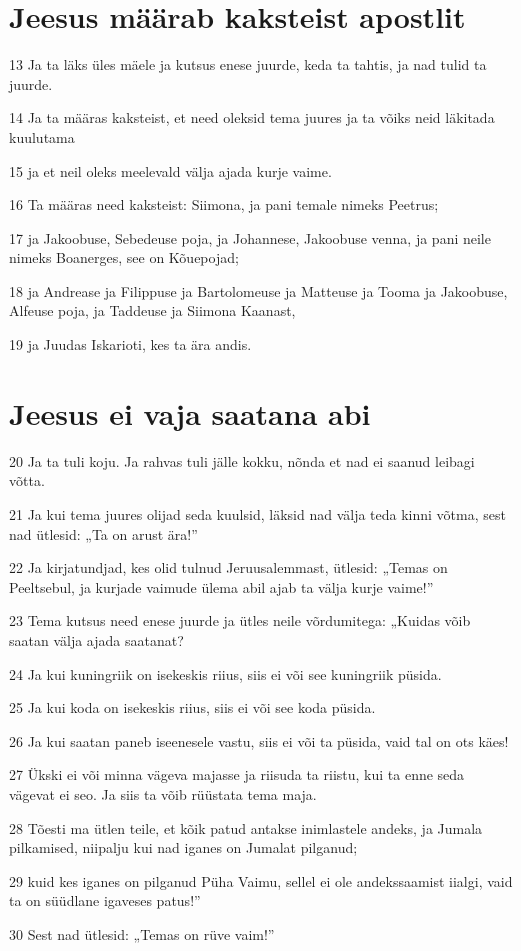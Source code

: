 \section*{Jeesus määrab kaksteist apostlit}

\par 13 Ja ta läks üles mäele ja kutsus enese juurde, keda ta tahtis, ja nad tulid ta juurde.
\par 14 Ja ta määras kaksteist, et need oleksid tema juures ja ta võiks neid läkitada kuulutama
\par 15 ja et neil oleks meelevald välja ajada kurje vaime.
\par 16 Ta määras need kaksteist: Siimona, ja pani temale nimeks Peetrus;
\par 17 ja Jakoobuse, Sebedeuse poja, ja Johannese, Jakoobuse venna, ja pani neile nimeks Boanerges, see on Kõuepojad;
\par 18 ja Andrease ja Filippuse ja Bartolomeuse ja Matteuse ja Tooma ja Jakoobuse, Alfeuse poja, ja Taddeuse ja Siimona Kaanast,
\par 19 ja Juudas Iskarioti, kes ta ära andis.

\section*{Jeesus ei vaja saatana abi}

\par 20 Ja ta tuli koju. Ja rahvas tuli jälle kokku, nõnda et nad ei saanud leibagi võtta.
\par 21 Ja kui tema juures olijad seda kuulsid, läksid nad välja teda kinni võtma, sest nad ütlesid: „Ta on arust ära!”
\par 22 Ja kirjatundjad, kes olid tulnud Jeruusalemmast, ütlesid: „Temas on Peeltsebul, ja kurjade vaimude ülema abil ajab ta välja kurje vaime!”
\par 23 Tema kutsus need enese juurde ja ütles neile võrdumitega: „Kuidas võib saatan välja ajada saatanat?
\par 24 Ja kui kuningriik on isekeskis riius, siis ei või see kuningriik püsida.
\par 25 Ja kui koda on isekeskis riius, siis ei või see koda püsida.
\par 26 Ja kui saatan paneb iseenesele vastu, siis ei või ta püsida, vaid tal on ots käes!
\par 27 Ükski ei või minna vägeva majasse ja riisuda ta riistu, kui ta enne seda vägevat ei seo. Ja siis ta võib rüüstata tema maja.
\par 28 Tõesti ma ütlen teile, et kõik patud antakse inimlastele andeks, ja Jumala pilkamised, niipalju kui nad iganes on Jumalat pilganud;
\par 29 kuid kes iganes on pilganud Püha Vaimu, sellel ei ole andekssaamist iialgi, vaid ta on süüdlane igaveses patus!”
\par 30 Sest nad ütlesid: „Temas on rüve vaim!”

